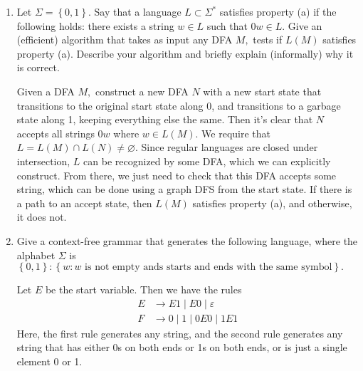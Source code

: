 \documentclass{article}
\begin{document}
\begin{enumerate}
	\item Let $\Sigma=\left\{ 0, 1 \right\}.$ Say that a language $L\subset\Sigma^*$ satisfies property (a) if the following holds: there exists a string $w\in L$ such that $0w\in L.$ Give an (efficient) algorithm that takes as input any DFA $M,$ tests if $L(M)$ satisfies property (a). Describe your algorithm and briefly explain (informally) why it is correct.
		\begin{soln}
			Given a DFA $M,$ construct a new DFA $N$ with a new start state that transitions to the original start state along 0, and transitions to a garbage state along 1, keeping everything else the same. Then it's clear that $N$ accepts all strings $0w$ where $w\in L(M).$ We require that $L=L(M)\cap L(N)\neq\varnothing.$ Since regular languages are closed under intersection, $L$ can be recognized by some DFA, which we can explicitly construct. From there, we just need to check that this DFA accepts some string, which can be done using a graph DFS from the start state. If there is a path to an accept state, then $L(M)$ satisfies property (a), and otherwise, it does not.
		\end{soln}

	\item Give a context-free grammar that generates the following language, where the alphabet $\Sigma$ is $\left\{ 0, 1 \right\}: \left\{ w:w\text{ is not empty ands starts and ends with the same symbol} \right\}.$
		\begin{soln}
			Let $E$ be the start variable. Then we have the rules
			\begin{align*}
				E &\to E1\mid E0\mid \varepsilon \\
				F&\to 0 \mid 1\mid 0E0\mid 1E1
			\end{align*}
			Here, the first rule generates any string, and the second rule generates any string that has either 0s on both ends or 1s on both ends, or is just a single element 0 or 1.
		\end{soln}
		
\end{enumerate}
\end{document}
